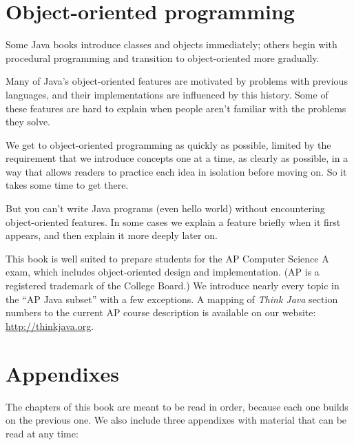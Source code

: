 \documentclass[12pt]{book}
\theoremstyle{exercise}
\begin{document}
\section*{Object-oriented programming}

Some Java books introduce classes and objects immediately; others begin with procedural programming and transition to object-oriented more gradually.

Many of Java's object-oriented features are motivated by problems with previous languages, and their implementations are influenced by this history.
Some of these features are hard to explain when people aren't familiar with the problems they solve.

We get to object-oriented programming as quickly as possible, limited by the requirement that we introduce concepts one at a time, as clearly as possible, in a way that allows readers to practice each idea in isolation before moving on.
So it takes some time to get there.

But you can't write Java programs (even hello world) without encountering object-oriented features.
In some cases we explain a feature briefly when it first appears, and then explain it more deeply later on.

This book is well suited to prepare students for the AP Computer Science A exam, which includes object-oriented design and implementation.
(AP is a registered trademark of the College Board.)
We introduce nearly every topic in the ``AP Java subset'' with a few exceptions.
A mapping of {\it Think Java} section numbers to the current AP course description is available on our website: \url{http://thinkjava.org}.



\section*{Appendixes}

The chapters of this book are meant to be read in order, because each one builds on the previous one.
We also include three appendixes with material that can be read at any time:
\end{document}
